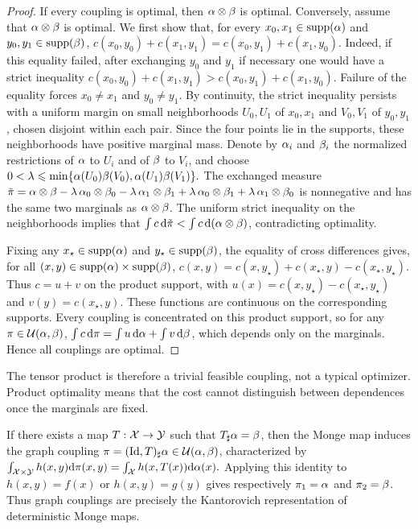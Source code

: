 \begin{proof}
If every coupling is optimal, then $\alpha\otimes\beta$ is optimal. Conversely, assume that $\alpha\otimes\beta$ is optimal. We first show that, for every $x_0,x_1\in\operatorname{supp}(\alpha)$ and $y_0,y_1\in\operatorname{supp}(\beta)$,
\(c(x_0,y_0)+c(x_1,y_1) = c(x_0,y_1)+c(x_1,y_0).\)
Indeed, if this equality failed, after exchanging $y_0$ and $y_1$ if necessary one would have a strict inequality
\(c(x_0,y_0)+c(x_1,y_1) > c(x_0,y_1)+c(x_1,y_0).\)
Failure of the equality forces $x_0\neq x_1$ and $y_0\neq y_1$. By continuity, the strict inequality persists with a uniform margin on small neighborhoods $U_0,U_1$ of $x_0,x_1$ and $V_0,V_1$ of $y_0,y_1$, chosen disjoint within each pair. Since the four points lie in the supports, these neighborhoods have positive marginal mass. Denote by $\alpha_i$ and $\beta_i$ the normalized restrictions of $\alpha$ to $U_i$ and of $\beta$ to $V_i$, and choose
\(0<\lambda\leqslant \min\{\alpha(U_0)\beta(V_0),\alpha(U_1)\beta(V_1)\}.\)
The exchanged measure
\(\tilde\pi = \alpha\otimes\beta -\lambda\,\alpha_0\otimes\beta_0 -\lambda\,\alpha_1\otimes\beta_1 +\lambda\,\alpha_0\otimes\beta_1 +\lambda\,\alpha_1\otimes\beta_0\)
is nonnegative and has the same two marginals as $\alpha\otimes\beta$. The uniform strict inequality on the neighborhoods implies that $\int c\,\mathrm{d}\tilde\pi<\int c\,\mathrm{d}(\alpha\otimes\beta)$, contradicting optimality.

Fixing any $x_\star\in\operatorname{supp}(\alpha)$ and $y_\star\in\operatorname{supp}(\beta)$, the equality of cross differences gives, for all $(x,y)\in\operatorname{supp}(\alpha)\times\operatorname{supp}(\beta)$, \(c(x,y)=c(x,y_\star)+c(x_\star,y)-c(x_\star,y_\star).\)
Thus $c=u+v$ on the product support, with $u(x)=c(x,y_\star)-c(x_\star,y_\star)$ and $v(y)=c(x_\star,y)$. These functions are continuous on the corresponding supports. Every coupling is concentrated on this product support, so for any $\pi\in\mathcal{U}(\alpha,\beta)$,
\(\int c\,\mathrm{d}\pi = \int u\,\mathrm{d}\alpha+\int v\,\mathrm{d}\beta\),
which depends only on the marginals. Hence all couplings are optimal.
\end{proof}
The tensor product is therefore a trivial feasible coupling, not a typical optimizer. Product optimality means that the cost cannot distinguish between dependences once the marginals are fixed.

If there exists a map $T:\mathcal{X}\to\mathcal{Y}$ such that $T_\sharp\alpha=\beta$, then the Monge map induces the graph coupling $\pi=(\mathrm{Id},T)_\sharp\alpha\in\mathcal{U}(\alpha,\beta)$, characterized by
\(\int_{\mathcal{X}\times\mathcal{Y}} h(x,y)\mathrm{d}\pi(x,y) = \int_{\mathcal{X}} h(x,T(x))\mathrm{d}\alpha(x).\)
Applying this identity to $h(x,y)=f(x)$ or $h(x,y)=g(y)$ gives respectively $\pi_1=\alpha$ and $\pi_2=\beta$. Thus graph couplings are precisely the Kantorovich representation of deterministic Monge maps.

